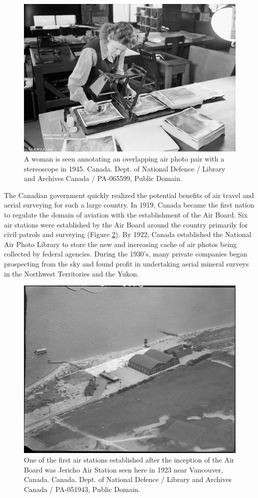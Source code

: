 \documentclass[
]{book}
\begin{document}
\begin{figure}
\includegraphics[width=0.75\linewidth]{images/01-woman-stereoscope} \caption{A woman is seen annotating an overlapping air photo pair with a stereoscope in 1945. Canada. Dept. of National Defence / Library and Archives Canada / PA-065599, Public Domain.}\label{fig:1-woman-stereoscope}
\end{figure}

The Canadian government quickly realized the potential benefits of air travel and aerial surveying for such a large country. In 1919, Canada became the first nation to regulate the domain of aviation with the establishment of the Air Board. Six air stations were established by the Air Board around the country primarily for civil patrols and surveying (Figure \ref{fig:1-jericho-air-station}). By 1922, Canada established the National Air Photo Library to store the new and increasing cache of air photos being collected by federal agencies. During the 1930's, many private companies began prospecting from the sky and found profit in undertaking aerial mineral surveys in the Northwest Territories and the Yukon.

\begin{figure}
\includegraphics[width=0.75\linewidth]{images/01-jericho-air-station} \caption{One of the first air stations established after the inception of the Air Board was Jericho Air Station seen here in 1923 near Vancouver, Canada. Canada. Dept. of National Defence / Library and Archives Canada / PA-051943, Public Domain.}\label{fig:1-jericho-air-station}
\end{figure}
\end{document}
